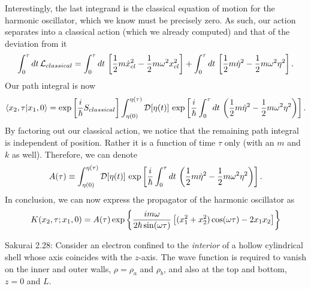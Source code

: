 \documentclass[11pt,letterpaper]{article}
\begin{document}
	Interestingly, the last integrand is the classical equation of motion for the harmonic oscillator, which we know must be precisely zero. As 
	such, our action separates into a classical action (which we already computed) and that of the deviation from it
	\[
		\int_0^\tau dt\, \mathcal{L}_{classical} = \int_0^\tau dt\, \left[\frac{1}{2}m\dot x_{cl}^2-\frac{1}{2}m\omega^2x_{cl}^2\right]+\int_0^\tau dt\, 	
		\left[\frac{1}{2}m\dot \eta^2-\frac{1}{2}m\omega^2\eta^2\right].
	\]
	Our path integral is now
	\[
		\braket{x_2,\tau|x_1,0} = \exp\left[\frac{i}{\hbar}S_{classical}\right]\int_{\eta(0)}^{\eta(\tau)}\mathcal{D}[\eta(t)]\,\exp\left[\frac{i}{\hbar} \int_{0}^{\tau} 
		dt\, \left(\frac{1}{2}m\dot \eta^2-\frac{1}{2}m\omega^2\eta^2\right)\right].
	\]
	By factoring out our classical action, we notice that the remaining path integral is independent of position. Rather it is a function of time 
	$\tau$ only (with an $m$ and $k$ as well). Therefore, we can denote
	\[
		A(\tau) \equiv \int_{\eta(0)}^{\eta(\tau)}\mathcal{D}[\eta(t)]\,\exp\left[\frac{i}{\hbar} \int_{0}^{\tau} dt\, \left(\frac{1}{2}m\dot \eta^2
		-\frac{1}{2}m\omega^2\eta^2\right)\right].
	\]
	In conclusion, we can now express the propagator of the harmonic oscillator as
	\[
		K(x_2,\tau;x_1,0) =  A(\tau)\exp{\left\{\frac{im\omega}{2\hbar\sin(\omega \tau)}\left[(x_1^2+x_2^2)\cos(\omega \tau)-2x_1x_2\right]\right\}}
	\]
	\item
	Sakurai 2.28: Consider an electron confined to the \emph{interior} of a hollow cylindrical shell whose axis coincides with the $z$-axis. The 
	wave function is required to vanish on the inner and outer walls, $\rho = \rho_a$ and $\rho_b$, and also at the top and bottom, $z=0$ and 
	$L$.
	 
\end{document}

